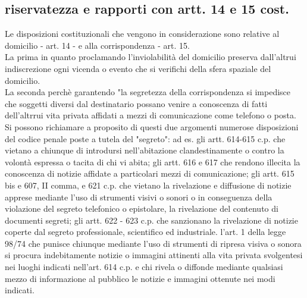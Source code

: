 \subsection{riservatezza e rapporti con artt. 14 e 15 cost.}
Le disposizioni costituzionali che vengono in considerazione sono relative al domicilio - art. 14 -  e alla corrispondenza - art. 15.
\\La prima in quanto proclamando l'inviolabilità del domicilio preserva dall'altrui indiscrezione ogni vicenda o evento che si verifichi della sfera spaziale del domicilio. 
\\La seconda perchè garantendo "la segretezza della corrispondenza si impedisce che soggetti diversi dal destinatario possano venire a conoscenza di fatti dell'altrrui vita privata affidati a mezzi di comunicazione come telefono o posta.
Si possono richiamare a proposito di questi due argomenti numerose disposizioni del codice penale poste a tutela del "segreto": ad es. gli artt. 614-615 c.p. che vietano a chiunque di introdursi nell'abitazione clandestinamente o contro la volontà espressa o tacita di chi vi abita; gli artt. 616 e 617 che rendono illecita la conoscenza di notizie affidate a particolari mezzi di comunicazione; gli artt. 615 bis e 607, II comma, e 621 c.p. che vietano la rivelazione e diffusione di notizie apprese mediante l'uso di strumenti visivi o sonori o in conseguenza della violazione del segreto telefonico o epistolare, la rivelazione del contenuto di documenti segreti; gli artt. 622 - 623 c.p. che sanzionano la rivelazione di notizie coperte dal segreto professionale, scientifico ed industriale.
l'art. 1 della legge 98/74 che punisce chiunque mediante l'uso di strumenti di ripresa visiva o sonora si procura indebitamente notizie o immagini attinenti alla vita privata svolgentesi nei luoghi indicati nell'art. 614 c.p. e chi rivela o diffonde mediante qualsiasi mezzo di informazione al pubblico le notizie e immagini ottenute nei modi indicati.


